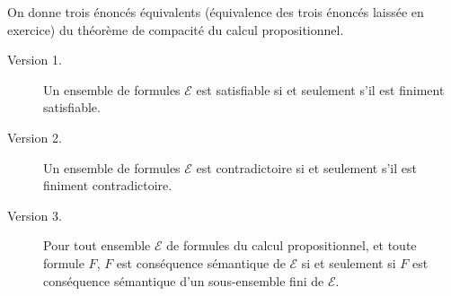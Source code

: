 \documentclass[./main]{subfiles}
\begin{document}
  \begin{thm}
    On donne trois énoncés équivalents (équivalence des trois énoncés laissée en exercice) du théorème de compacité du calcul propositionnel.

    \begin{description}
      \item[Version 1.] Un ensemble de formules $\mathcal{E}$ est satisfiable si et seulement s'il est finiment satisfiable.
      \item[Version 2.] Un ensemble de formules $\mathcal{E}$ est contradictoire si et seulement s'il est finiment contradictoire.
      \item[Version 3.] Pour tout ensemble $\mathcal{E}$ de formules du calcul propositionnel, et toute formule $F$, $F$ est conséquence sémantique de $\mathcal{E}$ si et seulement si $F$ est conséquence sémantique d'un sous-ensemble fini de $\mathcal{E}$.
    \end{description}

    \label{chap1-comp}
  \end{thm}
\end{document}
